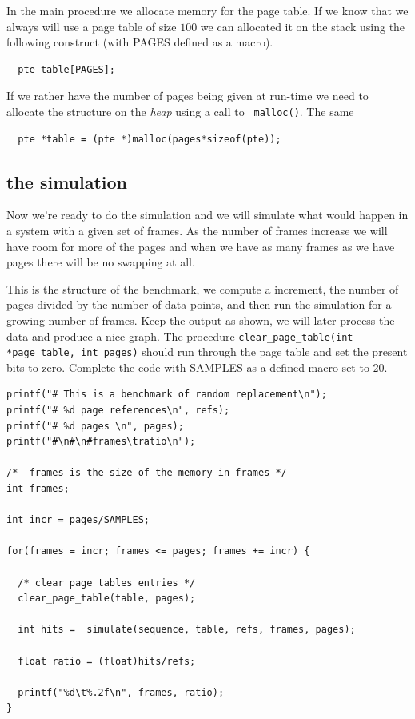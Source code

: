 \documentclass[a4paper,11pt]{article}
\begin{document}
In the main procedure we allocate memory for the page table.  If we
know that we always will use a page table of size $100$ we can
 allocated it on the stack using the following construct (with PAGES defined as a macro).

\begin{lstlisting}
  pte table[PAGES];
\end{lstlisting}

If we rather have the number of pages being given at run-time we need
to allocate the structure on the {\em heap} using a call to {\tt
  malloc()}.  The same 

\begin{lstlisting}
  pte *table = (pte *)malloc(pages*sizeof(pte));
\end{lstlisting}


\subsection{the simulation}

Now we're ready to do the simulation and we will simulate what would
happen in a system with a given set of frames. As the number of frames
increase we will have room for more of the pages and when we have as
many frames as we have pages there will be no swapping at all.

This is the structure of the benchmark, we compute a increment, the
number of pages divided by the number of data points, and then run the
simulation for a growing number of frames. Keep the output as shown,
we will later process the data and produce a nice graph. The procedure
{\tt clear\_page\_table(int *page\_table, int pages)} should run through
the page table and set the present bits to zero. Complete the code
with SAMPLES as a defined macro set to $20$.

\begin{lstlisting}
printf("# This is a benchmark of random replacement\n");
printf("# %d page references\n", refs);
printf("# %d pages \n", pages);
printf("#\n#\n#frames\tratio\n");
  
/*  frames is the size of the memory in frames */
int frames;

int incr = pages/SAMPLES;
  
for(frames = incr; frames <= pages; frames += incr) {

  /* clear page tables entries */
  clear_page_table(table, pages);

  int hits =  simulate(sequence, table, refs, frames, pages);

  float ratio = (float)hits/refs;

  printf("%d\t%.2f\n", frames, ratio);
}
\end{lstlisting}
 
\end{document}
